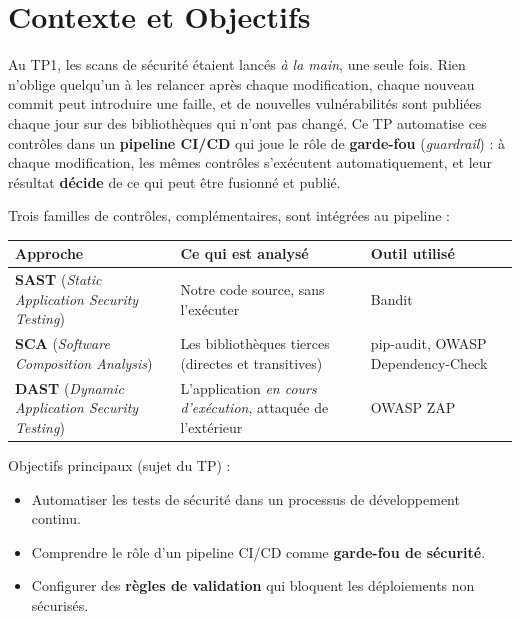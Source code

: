 \documentclass[11pt,a4paper]{article}
\begin{document}
\setcounter{page}{1}
\tableofcontents
\newpage

\section{Contexte et Objectifs}
Au TP1, les scans de sécurité étaient lancés \emph{à la main}, une seule fois. Rien n'oblige
quelqu'un à les relancer après chaque modification, chaque nouveau commit peut introduire une
faille, et de nouvelles vulnérabilités sont publiées chaque jour sur des bibliothèques qui n'ont
pas changé. Ce TP automatise ces contrôles dans un \textbf{pipeline CI/CD} qui joue le rôle de
\textbf{garde-fou} (\emph{guardrail}) : à chaque modification, les mêmes contrôles s'exécutent
automatiquement, et leur résultat \textbf{décide} de ce qui peut être fusionné et publié.

Trois familles de contrôles, complémentaires, sont intégrées au pipeline :

\begin{table}[H]
\centering
\begin{tabularx}{\textwidth}{@{}lLL@{}}
\toprule
\textbf{Approche} & \textbf{Ce qui est analysé} & \textbf{Outil utilisé} \\
\midrule
\textbf{SAST} (\emph{Static Application Security Testing}) & Notre code source, sans l'exécuter & Bandit \\
\textbf{SCA} (\emph{Software Composition Analysis}) & Les bibliothèques tierces (directes et transitives) & pip-audit, OWASP Dependency-Check \\
\textbf{DAST} (\emph{Dynamic Application Security Testing}) & L'application \emph{en cours d'exécution}, attaquée de l'extérieur & OWASP ZAP \\
\bottomrule
\end{tabularx}
\end{table}

\noindent Objectifs principaux (sujet du TP) :
\begin{itemize}
  \item Automatiser les tests de sécurité dans un processus de développement continu.
  \item Comprendre le rôle d'un pipeline CI/CD comme \textbf{garde-fou de sécurité}.
  \item Configurer des \textbf{règles de validation} qui bloquent les déploiements non sécurisés.
\end{itemize}
\end{document}
